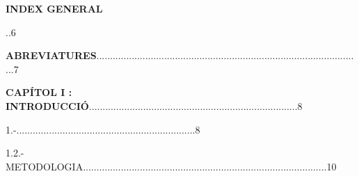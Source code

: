 \documentclass[12pt]{article}
\renewcommand{\_}{\kern-1.5pt\textunderscore\kern-1.5pt}
\begin{document}
\vspace{\baselineskip}

\vspace{\baselineskip}

\vspace{\baselineskip}
\begin{Center}
{\fontsize{16pt}{19.2pt}\selectfont \textbf{INDEX GENERAL}\par}
\end{Center}\par


\vspace{\baselineskip}

\vspace{\baselineskip}
\begin{justify}
..6
\end{justify}\par


\vspace{\baselineskip}
\begin{justify}
\textbf{ABREVIATURES}..................................................................................................7
\end{justify}\par


\vspace{\baselineskip}

\vspace{\baselineskip}
\begin{justify}
\textbf{CAPÍTOL I : INTRODUCCIÓ}.............................................................................8
\end{justify}\par


\vspace{\baselineskip}

\vspace{\baselineskip}
\begin{justify}
1.-..................................................................8
\end{justify}\par


\vspace{\baselineskip}
\begin{justify}
1.2.- METODOLOGIA..........................................................................................10
\end{justify}\par


\vspace{\baselineskip}
\end{document}
